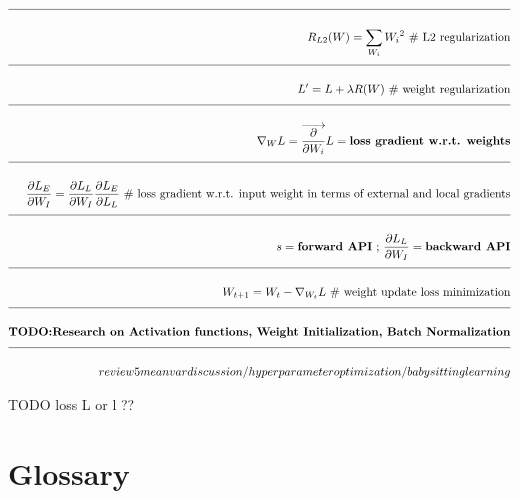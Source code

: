 \documentclass[a4paper]{article}
\newcommand{\eqComment}[1]{\text{  \# #1}}
\newcommand{\eqSep}{\text{ ;  }}
\newcommand{\n}{\\[1.5ex] \hline \nonumber \\[0ex]}
\newcommand*\features{}
\begin{document}
\begin{tcolorbox}
\begin{align}
\n R_{L2}(W) = \sum_{W_i} {W_i}^2 \eqComment{L2 regularization}
\n L^\prime = L + \lambda R(W) \eqComment{weight regularization}
\n \nabla_W L = \overrightarrow{\frac{\partial}{\partial W_i}} L = \textbf{loss gradient w.r.t. weights}
\n \frac{\partial L_E}{\partial W_I} = \frac{\partial L_L}{\partial W_I} \frac{\partial L_E}{\partial L_L} \eqComment{loss gradient w.r.t. input weight in terms of external and local gradients}
\n s = \textbf{forward API} \eqSep \frac{\partial L_L}{\partial W_I} = \textbf{backward API}
\n W_{t+1} = W_{t} - \nabla_{W_t} L \eqComment{weight update loss minimization}
\n \textbf{TODO:Research on Activation functions, Weight Initialization, Batch Normalization}
\n review 5 mean var discussion / hyperparameter optimization / babysitting learning
\end{align}
\end{tcolorbox}
TODO loss L or l ??


\section{Glossary}
\begin{multicols}{4}
\features
\end{multicols}


\end{document}
